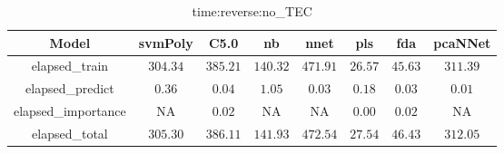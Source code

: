 \begin{table}[!ht]
	\centering
	\begin{tabular}{|c|c|c|c|c|c|c|c|}
		\hline
		Model & svmPoly & C5.0 & nb & nnet & pls & fda & pcaNNet \\ \hline
		elapsed_train & $304.34$ & $385.21$ & $140.32$ & $471.91$ & $26.57$ & $45.63$ & $311.39$ \\ \hline
		elapsed_predict & $0.36$ & $0.04$ & $1.05$ & $0.03$ & $0.18$ & $0.03$ & $0.01$ \\ \hline
		elapsed_importance & NA & $0.02$ & NA & NA & $0.00$ & $0.02$ & NA \\ \hline
		elapsed_total & $305.30$ & $386.11$ & $141.93$ & $472.54$ & $27.54$ & $46.43$ & $312.05$ \\ \hline
	\end{tabular}
	\caption{time:reverse:no_TEC}
	\label{tab:time:reverse:no_TEC}
\end{table}
